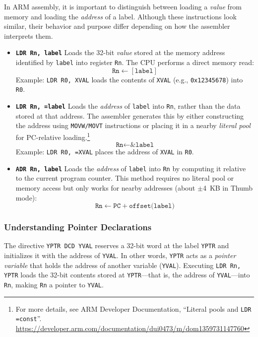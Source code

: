 In ARM assembly, it is important to distinguish between loading a \emph{value} from memory and loading the \emph{address} of a label.  
Although these instructions look similar, their behavior and purpose differ depending on how the assembler interprets them.
\begin{itemize}[nosep]
    \item \textbf{\texttt{LDR Rn, label}}  
    Loads the 32-bit \emph{value} stored at the memory address identified by \texttt{label} into register \texttt{Rn}.  
    The CPU performs a direct memory read:
    \[
      \texttt{Rn} \leftarrow [\texttt{label}]
    \]
    Example: \texttt{LDR R0, XVAL} loads the contents of \texttt{XVAL} (e.g., \texttt{0x12345678}) into \texttt{R0}.
    
    \item \textbf{\texttt{LDR Rn, =label}}  
    Loads the \emph{address} of \texttt{label} into \texttt{Rn}, rather than the data stored at that address.  
    The assembler generates this by either constructing the address using \texttt{MOVW/MOVT} instructions or placing it in a nearby \emph{literal pool} for PC-relative loading.\footnote{For more details, see ARM Developer Documentation, “Literal pools and \texttt{LDR =const}”. \url{https://developer.arm.com/documentation/dui0473/m/dom1359731147760}}  
    \[
      \texttt{Rn} \leftarrow \texttt{\&label}
    \]
    Example: \texttt{LDR R0, =XVAL} places the address of \texttt{XVAL} in \texttt{R0}.
    
    \item \textbf{\texttt{ADR Rn, label}}  
    Loads the \emph{address} of \texttt{label} into \texttt{Rn} by computing it relative to the current program counter.  
    This method requires no literal pool or memory access but only works for nearby addresses (about $\pm$4~KB in Thumb mode):  
    \[
      \texttt{Rn} \leftarrow \texttt{PC} + \texttt{offset(label)}
    \]
\end{itemize}



\subsubsection{Understanding Pointer Declarations}
The directive \texttt{YPTR DCD YVAL} reserves a 32-bit word at the label \texttt{YPTR} and initializes it with the address of \texttt{YVAL}.  
In other words, \texttt{YPTR} acts as a \emph{pointer variable} that holds the address of another variable (\texttt{YVAL}).  
Executing \texttt{LDR Rn, YPTR} loads the 32-bit contents stored at \texttt{YPTR}—that is, the address of \texttt{YVAL}—into \texttt{Rn}, making \texttt{Rn} a pointer to \texttt{YVAL}.


